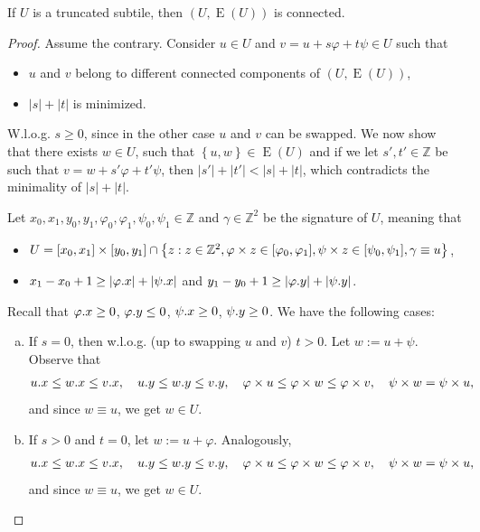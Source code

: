 \documentclass[twoside,leqno]{article}
\newcommand{\Z}{\mathbb{Z}}
\renewcommand{\phi}{\varphi}
\newcommand{\set}[1]{\left\lbrace #1 \right\rbrace}
\newcommand{\eq}[1]{\begin{align*} #1 \end{align*}}
\DeclareMathOperator*{\Edges}{E}
\newcommand{\absolute}[1]{\left\lvert#1\right\rvert}
\begin{document}
\begin{lemma}\label{lattice_graph_connectivity}
	If $U$ is a truncated subtile, then $(U, \Edges(U))$ is connected.
	\begin{proof}
		Assume the contrary.
		Consider $u \in U$ and $v = u + s \phi + t \psi \in U$ such that
		\begin{itemize}
			\item $u$ and $v$ belong to different connected components of $(U, \Edges(U))$,
			\item $\absolute{s} + \absolute{t}$ is minimized.
		\end{itemize}
		W.l.o.g. $s \ge 0$, since in the other case $u$ and $v$ can be swapped.
		We now show that there exists $w \in U$, such that $\set{u, w} \in \Edges(U)$ and if we let $s', t' \in \Z$ be such that $v = w + s'\phi + t'\psi$, then $\absolute{s'} + \absolute{t'} < \absolute{s} + \absolute{t}$, which contradicts the minimality of $\absolute{s} + \absolute{t}$. 
	
		Let $x_0, x_1, y_0, y_1, \phi_0, \phi_1, \psi_0, \psi_1 \in \Z$ and $\gamma \in \Z^2$ be the signature of $U$, meaning that
		\begin{itemize}
			\item $ U = [x_0, x_1] \times [y_0, y_1] \cap \set{z : z \in \Z^2, \h{z} \in [\phi_0, \phi_1], \s{z} \in [\psi_0, \psi_1], \gamma \equiv u}$,
			\item $x_1 - x_0 + 1 \ge \absolute{\x{\phi}} + \absolute{\x{\psi}}$ and $y_1 - y_0 + 1 \ge \absolute{\y{\phi}} + \absolute{\y{\psi}}$.
		\end{itemize}
		
		Recall that $\x{\phi} \ge 0$, $\y{\phi} \le 0$, $\psi.x \ge 0$, $\psi.y \ge 0$. We have the following cases:
		\begin{enumerate}[(a)]
			\item \label{it:s0_tneg} If $s = 0$, then w.l.o.g. (up to swapping $u$ and $v$) $t > 0$. Let $w := u + \psi$. Observe that
				\eq{
					\x{u} \le \x{w} \le \x{v}, \quad \y{u} \le \y{w} \le \y{v}, \quad \h{u} \le \h{w} \le \h{v}, \quad \s{w} = \s{u},
				}
				and since $w \equiv u$, we get $w \in U$. 
			
			\item If $s > 0$ and $t = 0$, let $w := u + \phi$. Analogously, 
				\eq{
					\x{u} \le \x{w} \le \x{v}, \quad \y{u} \le \y{w} \le \y{v}, \quad \h{u} \le \h{w} \le \h{v}, \quad \s{w} = \s{u},
				}
				and since $w \equiv u$, we get $w \in U$. 
			

\end{enumerate}
\end{proof}
\end{lemma}
\end{document}

